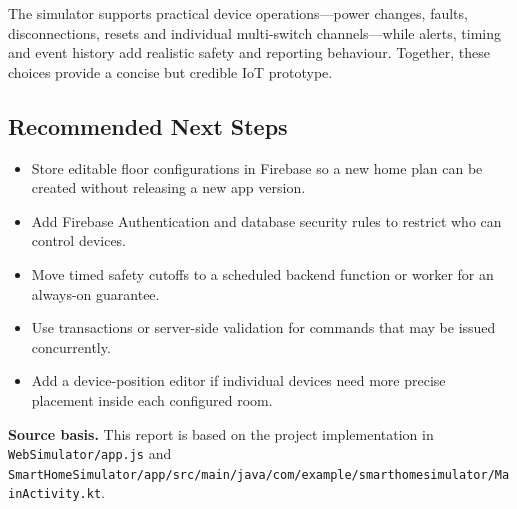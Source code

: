 \documentclass[11pt,a4paper]{article}
\begin{document}
The simulator supports practical device operations---power changes, faults, disconnections, resets and individual multi-switch channels---while alerts, timing and event history add realistic safety and reporting behaviour. Together, these choices provide a concise but credible IoT prototype.

\subsection{Recommended Next Steps}
\begin{itemize}
\item Store editable floor configurations in Firebase so a new home plan can be created without releasing a new app version.
\item Add Firebase Authentication and database security rules to restrict who can control devices.
\item Move timed safety cutoffs to a scheduled backend function or worker for an always-on guarantee.
\item Use transactions or server-side validation for commands that may be issued concurrently.
\item Add a device-position editor if individual devices need more precise placement inside each configured room.
\end{itemize}

\vfill
\noindent\colorbox{note}{\parbox{0.94\textwidth}{\small\textbf{Source basis.} This report is based on the project implementation in \texttt{WebSimulator/app.js} and \texttt{SmartHomeSimulator/app/src/main/java/com/example/smarthomesimulator/MainActivity.kt}.}}
\end{document}
